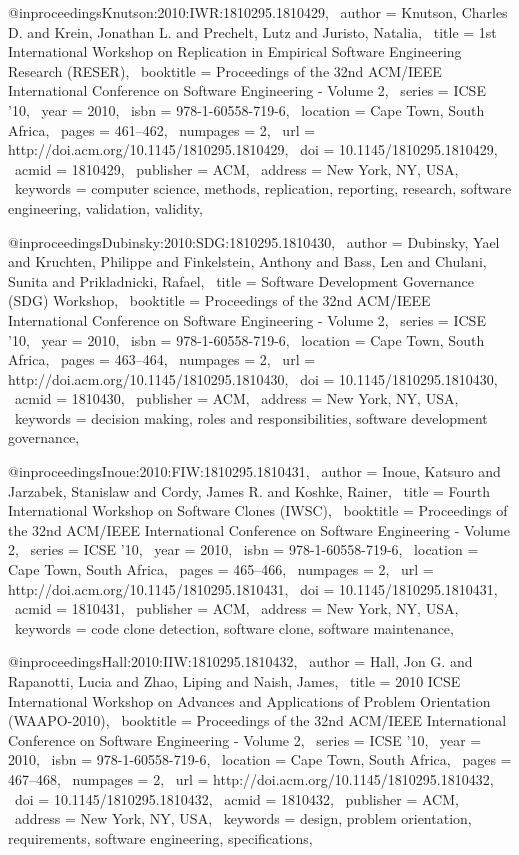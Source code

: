 @inproceedings{Knutson:2010:IWR:1810295.1810429,
 author = {Knutson, Charles D. and Krein, Jonathan L. and Prechelt, Lutz and Juristo, Natalia},
 title = {1st International Workshop on Replication in Empirical Software Engineering Research (RESER)},
 booktitle = {Proceedings of the 32nd ACM/IEEE International Conference on Software Engineering - Volume 2},
 series = {ICSE '10},
 year = {2010},
 isbn = {978-1-60558-719-6},
 location = {Cape Town, South Africa},
 pages = {461--462},
 numpages = {2},
 url = {http://doi.acm.org/10.1145/1810295.1810429},
 doi = {10.1145/1810295.1810429},
 acmid = {1810429},
 publisher = {ACM},
 address = {New York, NY, USA},
 keywords = {computer science, methods, replication, reporting, research, software engineering, validation, validity},
} 

@inproceedings{Dubinsky:2010:SDG:1810295.1810430,
 author = {Dubinsky, Yael and Kruchten, Philippe and Finkelstein, Anthony and Bass, Len and Chulani, Sunita and Prikladnicki, Rafael},
 title = {Software Development Governance (SDG) Workshop},
 booktitle = {Proceedings of the 32nd ACM/IEEE International Conference on Software Engineering - Volume 2},
 series = {ICSE '10},
 year = {2010},
 isbn = {978-1-60558-719-6},
 location = {Cape Town, South Africa},
 pages = {463--464},
 numpages = {2},
 url = {http://doi.acm.org/10.1145/1810295.1810430},
 doi = {10.1145/1810295.1810430},
 acmid = {1810430},
 publisher = {ACM},
 address = {New York, NY, USA},
 keywords = {decision making, roles and responsibilities, software development governance},
} 

@inproceedings{Inoue:2010:FIW:1810295.1810431,
 author = {Inoue, Katsuro and Jarzabek, Stanislaw and Cordy, James R. and Koshke, Rainer},
 title = {Fourth International Workshop on Software Clones (IWSC)},
 booktitle = {Proceedings of the 32nd ACM/IEEE International Conference on Software Engineering - Volume 2},
 series = {ICSE '10},
 year = {2010},
 isbn = {978-1-60558-719-6},
 location = {Cape Town, South Africa},
 pages = {465--466},
 numpages = {2},
 url = {http://doi.acm.org/10.1145/1810295.1810431},
 doi = {10.1145/1810295.1810431},
 acmid = {1810431},
 publisher = {ACM},
 address = {New York, NY, USA},
 keywords = {code clone detection, software clone, software maintenance},
} 

@inproceedings{Hall:2010:IIW:1810295.1810432,
 author = {Hall, Jon G. and Rapanotti, Lucia and Zhao, Liping and Naish, James},
 title = {2010 ICSE International Workshop on Advances and Applications of Problem Orientation (WAAPO-2010)},
 booktitle = {Proceedings of the 32nd ACM/IEEE International Conference on Software Engineering - Volume 2},
 series = {ICSE '10},
 year = {2010},
 isbn = {978-1-60558-719-6},
 location = {Cape Town, South Africa},
 pages = {467--468},
 numpages = {2},
 url = {http://doi.acm.org/10.1145/1810295.1810432},
 doi = {10.1145/1810295.1810432},
 acmid = {1810432},
 publisher = {ACM},
 address = {New York, NY, USA},
 keywords = {design, problem orientation, requirements, software engineering, specifications},
} 


